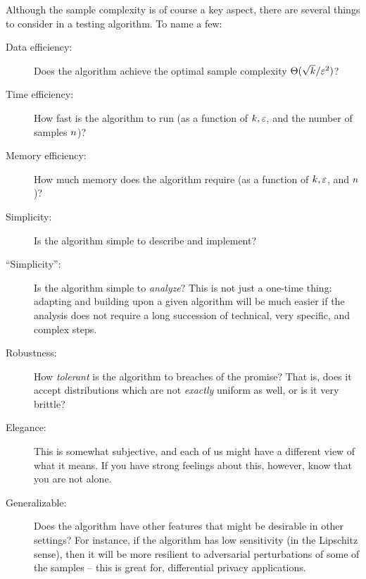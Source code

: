 Although the sample complexity is of course a key aspect, there are several things to consider in a testing algorithm. To name a few:
\begin{description}
  \item[Data efficiency:] Does the algorithm achieve the optimal sample complexity $\Theta(\sqrt{k}/\varepsilon^2)$?
  \item[Time efficiency:] How fast is the algorithm to run (as a function of $k,\varepsilon$, and the number of samples $n$)?
  \item[Memory efficiency:] How much memory does the algorithm require (as a function of $k,\varepsilon$, and $n$)?
  \item[Simplicity:] Is the algorithm simple to describe and implement?
  \item[``Simplicity'':] Is the algorithm simple to \emph{analyze}? This is not just a one-time thing: adapting and building upon a given algorithm will be much easier if the analysis does not require a long succession of technical, very specific, and complex steps.
  \item[Robustness:] How \emph{tolerant} is the algorithm to breaches of the promise? That is, does it accept distributions which are not \emph{exactly} uniform as well, or is it very brittle?
  \item[Elegance:] This is somewhat subjective, and each of us might have a different view of what it means. If you have strong feelings about this, however, know that you are not alone.
  \item[Generalizable:] Does the algorithm have other features that might be desirable in other settings? For instance, if the algorithm has low sensitivity (in the Lipschitz sense), then it will be more resilient to adversarial perturbations of some of the samples -- this is great for, \eg differential privacy applications. 
\end{description}

